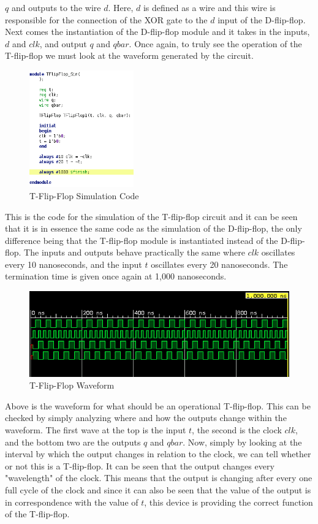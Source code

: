 \documentclass[12pt]{article}
\begin{document}
    $q$ and outputs to the wire $d$. Here, $d$ is defined as a wire and this
    wire is responsible for the connection of the XOR gate to the $d$ input of
    the D-flip-flop. Next comes the instantiation of the D-flip-flop module and
    it takes in the inputs, $d$ and $clk$, and output $q$ and $qbar$. Once
    again, to truly see the operation of the T-flip-flop we must look at the
    waveform generated by the circuit.
    \begin{figure}[h]
        \centering
        \includegraphics[width=0.4\textwidth]{TFlipFlop Simulation Code.png}
        \caption{T-Flip-Flop Simulation Code}
    \end{figure}
    \par This is the code for the simulation of the T-flip-flop circuit and it
    can be seen that it is in essence the same code as the simulation of the
    D-flip-flop, the only difference being that the T-flip-flop module is
    instantiated instead of the D-flip-flop. The inputs and outputs behave
    practically the same where $clk$ oscillates every 10 nanoseconds, and the
    input $t$ oscillates every 20 nanoseconds. The termination time is given
    once again at 1,000 nanoseconds.
    \begin{figure}[h]
        \centering
        \includegraphics[width=1.0\textwidth]{TFlipFlop Waveform.png}
        \caption{T-Flip-Flop Waveform}
    \end{figure}
    \par Above is the waveform for what should be an operational T-flip-flop.
    This can be checked by simply analyzing where and how the outputs change
    within the waveform. The first wave at the top is the input $t$, the second
    is the clock $clk$, and the bottom two are the outputs $q$ and $qbar$. Now,
    simply by looking at the interval by which the output changes in relation to
    the clock, we can tell whether or not this is a T-flip-flop. It can be seen
    that the output changes every "wavelength" of the clock. This means that the
    output is changing after every one full cycle of the clock and since it can
    also be seen that the value of the output is in correspondence with the
    value of $t$, this device is providing the correct function of the
    T-flip-flop.
\end{document}
